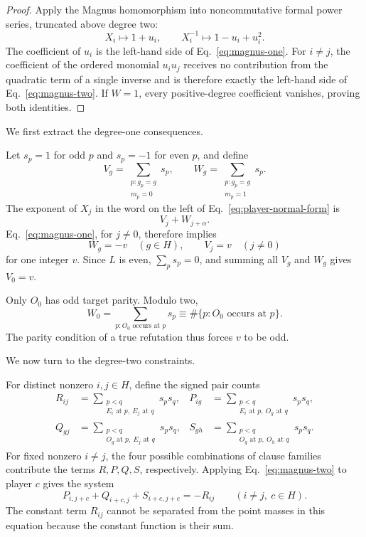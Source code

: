\documentclass[11pt]{article}
\theoremstyle{definition}
\theoremstyle{remark}
\numberwithin{equation}{section}
\begin{document}
\begin{proof}
Apply the Magnus homomorphism into noncommutative formal power series,
truncated above degree two:
\[
  X_i\longmapsto1+u_i,
  \qquad
  X_i^{-1}\longmapsto1-u_i+u_i^2.
\]
The coefficient of \(u_i\) is the left-hand side of
Eq.~\eqref{eq:magnus-one}.  For \(i\ne j\), the coefficient of the ordered
monomial \(u_i u_j\) receives no contribution from the quadratic term of a
single inverse and is therefore exactly the left-hand side of
Eq.~\eqref{eq:magnus-two}.  If \(W=1\), every positive-degree coefficient
vanishes, proving both identities.
\end{proof}

We first extract the degree-one consequences.

Let \(s_p=1\) for odd \(p\) and \(s_p=-1\) for even \(p\), and define
\[
  V_g=\sum_{\substack{p:g_p=g\\m_p=0}}s_p,
  \qquad
  W_g=\sum_{\substack{p:g_p=g\\m_p=1}}s_p.
\]
The exponent of \(X_j\) in the word on the left of
Eq.~\eqref{eq:player-normal-form} is
\[
  V_j+W_{j+\alpha}.
\]
Eq.~\eqref{eq:magnus-one}, for \(j\ne0\), therefore implies
\[
  W_g=-v\quad(g\in H),
  \qquad
  V_j=v\quad(j\ne0)
\]
for one integer \(v\).  Since \(L\) is even,
\(\sum_p s_p=0\), and summing all \(V_g\) and \(W_g\) gives \(V_0=v\).

Only \(O_0\) has odd target parity.  Modulo two,
\[
  W_0
  =
  \sum_{p:O_0\text{ occurs at }p}s_p
  \equiv
  \#\{p:O_0\text{ occurs at }p\}.
\]
The parity condition of a true refutation thus forces \(v\) to be odd.

We now turn to the degree-two constraints.

For distinct nonzero \(i,j\in H\), define the signed pair counts
\begin{align*}
  R_{ij}
  &=
  \sum_{\substack{p<q\\E_i\text{ at }p,\ E_j\text{ at }q}}s_ps_q,
  &
  P_{ig}
  &=
  \sum_{\substack{p<q\\E_i\text{ at }p,\ O_g\text{ at }q}}s_ps_q,\\
  Q_{gj}
  &=
  \sum_{\substack{p<q\\O_g\text{ at }p,\ E_j\text{ at }q}}s_ps_q,
  &
  S_{gh}
  &=
  \sum_{\substack{p<q\\O_g\text{ at }p,\ O_h\text{ at }q}}s_ps_q.
\end{align*}
For fixed nonzero \(i\ne j\), the four possible combinations of clause
families contribute the terms \(R,P,Q,S\), respectively.  Applying
Eq.~\eqref{eq:magnus-two} to player \(c\) gives the system
\begin{equation}\label{eq:Eprime-app}
  P_{i,j+c}+Q_{i+c,j}+S_{i+c,j+c}=-R_{ij}
  \qquad(i\ne j,\ c\in H).
\end{equation}
The constant term \(R_{ij}\) cannot be separated from the point masses in
this equation because the constant function is their sum.
\end{document}
